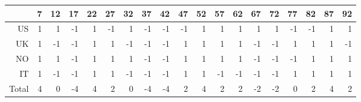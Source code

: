 \begin{tabular}{rrrrrrrrrrrrrrrrrrr}
  \hline
 & 7 & 12 & 17 & 22 & 27 & 32 & 37 & 42 & 47 & 52 & 57 & 62 & 67 & 72 & 77 & 82 & 87 & 92 \\ 
  \hline
US & 1 & 1 & -1 & 1 & -1 & 1 & -1 & -1 & -1 & 1 & 1 & 1 & 1 & 1 & -1 & -1 & 1 & 1 \\ 
  UK & 1 & -1 & -1 & 1 & 1 & -1 & -1 & -1 & 1 & 1 & 1 & 1 & -1 & -1 & 1 & 1 & 1 & -1 \\ 
  NO & 1 & 1 & -1 & 1 & 1 & 1 & -1 & -1 & 1 & 1 & 1 & 1 & -1 & -1 & -1 & 1 & 1 & 1 \\ 
  IT & 1 & -1 & -1 & 1 & 1 & -1 & -1 & -1 & 1 & 1 & -1 & -1 & -1 & -1 & 1 & 1 & 1 & 1 \\ 
  \hline
  Total & 4 & 0 & -4 & 4 & 2 & 0 & -4 & -4 & 2 & 4 & 2 & 2 & -2 & -2 & 0 & 2 & 4 & 2 \\ 
   \hline
\end{tabular}